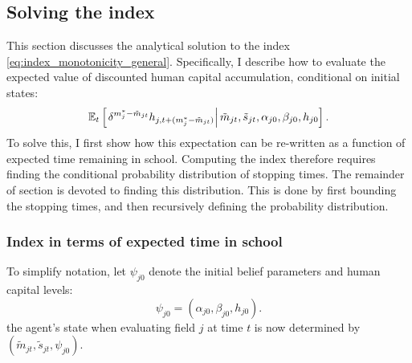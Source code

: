 \documentclass[11 pt]{article}
\newcommand{\pr}[1]{\left( #1 \right)}
\newcommand{\ce}[2]{\left[\left. #1 \right\vert #2 \right]}
\newcommand{\study}{m} %
\newcommand{\pass}{s}
\newcommand{\states}{\tilde{\study}_{jt}, \tilde{\pass}_{jt}, \alpha_{j0}, \beta_{j0}, h_{j0}}
\newcommand{\pstates}{\tilde{\study}_{jt}, \tilde{\pass}_{jt}, \psi_{j0}}
\begin{document}
\subsection{Solving the index}\label{sec:solving_index}

This section discusses the analytical solution to the index \eqref{eq:index_monotonicity_general}.
Specifically, I describe how to evaluate the expected value of discounted human capital accumulation, conditional on initial states:
\begin{equation}\label{eq:expected_discounted_hc_accumulation}
    \EE_t \ce{
        \delta^{\study_j^* - \tilde{\study}_{jt}}
        h_{j,t + (\study_j^* - \tilde{\study}_{jt})}
    }{\states}.
\end{equation}
To solve this, I first show how this expectation can be re-written as a function of expected time remaining in school.
Computing the index therefore requires finding the conditional probability distribution of stopping times. 
The remainder of section is devoted to finding this distribution. 
This is done by first bounding the stopping times, and then recursively defining the probability distribution. 

\subsubsection*{Index in terms of expected time in school}

To simplify notation, let $\psi_{j0}$ denote the initial belief parameters and human capital levels:
\begin{equation*}
    \psi_{j0} = \pr{\alpha_{j0}, \beta_{j0}, h_{j0}}.
\end{equation*}
the agent's state when evaluating field $j$ at time $t$ is now determined by $\pr{\pstates}$.
\end{document}
